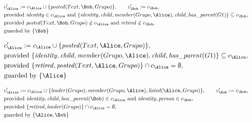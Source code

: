 \begin{align*}
&
c'_
{
\Alice
}
 := 
c_
{
\Alice
}
 \cup 
\{
\mathit{\detokenize{
posted
}}
(
Text
,
\Bob
,
Grupo
)
\}
, \qquad 
c'_
{
\Bob
}
 := 
c_
{
\Bob
}
,\\
&
\text{provided } 
\mathit{\detokenize{
identity
}}
 \in c_
{
\Alice
}
 \text{ and } 
\{
\mathit{\detokenize{
identity
}}
,
\mathit{\detokenize{
child
}}
,
\mathit{\detokenize{
member
}}
(
Grupo
,
\Alice
)
,
\mathit{\detokenize{
child
}}
,
\mathit{\detokenize{
has_parent
}}
(
G1
)
\}
 \subseteq c_
{
\Bob
}
,\\
&
\text{provided } 
\mathit{\detokenize{
posted
}}
(
Text
,
\Bob
,
Grupo
)
 \notin c_
{
\Alice
}
 \text{ and } 
\mathit{\detokenize{
retired
}}
 \notin c_
{
\Bob
}
,\\
&
\text{guarded by } \{
\Bob
\}
\end{align*}

\begin{align*}
&
c'_
{
\Alice
}
 := 
c_
{
\Alice
}
 \cup 
\{
\mathit{\detokenize{
posted
}}
(
Text
,
\Alice
,
Grupo
)
\}
,\\
&
\text{provided } 
\{
\mathit{\detokenize{
identity
}}
,
\mathit{\detokenize{
child
}}
,
\mathit{\detokenize{
member
}}
(
Grupo
,
\Alice
)
,
\mathit{\detokenize{
child
}}
,
\mathit{\detokenize{
has_parent
}}
(
G1
)
\}
 \subseteq c_
{
\Alice
}
,\\
&
\text{provided } 
\{
\mathit{\detokenize{
retired
}}
,
\mathit{\detokenize{
posted
}}
(
Text
,
\Alice
,
Grupo
)
\}
 \cap c_
{
\Alice
}
 = \emptyset
,\\
&
\text{guarded by } \{
\Alice
\}
\end{align*}

\begin{align*}
&
c'_
{
\Alice
}
 := 
c_
{
\Alice
}
 \cup 
\{
\mathit{\detokenize{
leader
}}
(
Grupo
)
,
\mathit{\detokenize{
member
}}
(
Grupo
,
\Alice
)
,
\mathit{\detokenize{
listed
}}
(
\Alice
,
Grupo
)
\}
, \qquad 
c'_
{
\Bob
}
 := 
c_
{
\Bob
}
,\\
&
\text{provided } 
\mathit{\detokenize{
identity
}}
,
\mathit{\detokenize{
child
}}
,
\mathit{\detokenize{
has_parent
}}
(
\Bob
)
 \in c_
{
\Alice
}
 \text{ and } 
\mathit{\detokenize{
identity
}}
,
\mathit{\detokenize{
person
}}
 \in c_
{
\Bob
}
,\\
&
\text{provided } 
\{
\mathit{\detokenize{
retired
}}
,
\mathit{\detokenize{
leader
}}
(
Grupo
)
\}
 \cap c_
{
\Alice
}
 = \emptyset
,\\
&
\text{guarded by } \{
\Alice
,
\Bob
\}
\end{align*}
